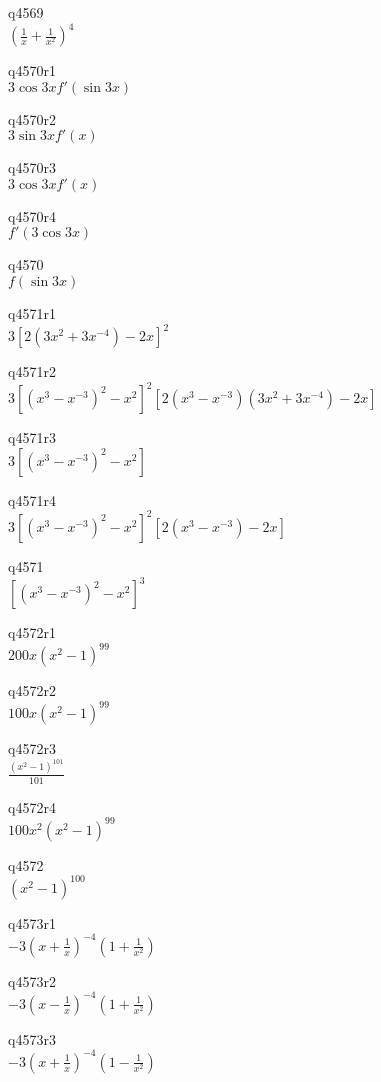 q4569\\
\(\displaystyle \left ( \frac{1}{x} + \frac{1}{x^2} \right ) ^4 \)

q4570r1\\
\(\displaystyle 3 \cos 3x f'(\sin 3x) \)

q4570r2\\
\(\displaystyle 3 \sin 3x f'(x) \)

q4570r3\\
\(\displaystyle 3\cos 3x f'(x) \)

q4570r4\\
\(\displaystyle f'(3 \cos 3x) \)

q4570\\
\(\displaystyle f(\sin 3x) \)

q4571r1\\
\(\displaystyle 3[2(3x^2 + 3x^{-4}) - 2x]^2 \)

q4571r2\\
\(\displaystyle 3[(x^3 - x^{-3})^2 - x^2]^2 [2(x^3 - x^{-3})(3x^2+ 3x^{-4}) - 2x] \)

q4571r3\\
\(\displaystyle 3[(x^3 - x^{-3})^2 - x^2] \)

q4571r4\\
\(\displaystyle 3[(x^3 - x^{-3})^2 - x^2]^2[2(x^3 - x^{-3}) - 2x] \)

q4571\\
\(\displaystyle [(x^3 - x^{-3})^2 - x^2]^3 \)

q4572r1\\
\(\displaystyle 200x(x^2 - 1)^{99} \)

q4572r2\\
\(\displaystyle 100x(x^2 - 1)^{99} \)

q4572r3\\
\(\displaystyle \frac{(x^2 - 1)^{101}}{101} \)

q4572r4\\
\(\displaystyle 100x^2(x^2 - 1)^{99} \)

q4572\\
\(\displaystyle (x^2 - 1)^{100} \)

q4573r1\\
\(\displaystyle -3 \left ( x + \frac{1}{x} \right ) ^{-4} \left ( 1 + \frac{1}{x^2} \right ) \)

q4573r2\\
\(\displaystyle -3 \left ( x - \frac{1}{x} \right )^{-4} \left ( 1 + \frac{1}{x^2} \right ) \)

q4573r3\\
\(\displaystyle -3 \left ( x + \frac{1}{x} \right ) ^{-4} \left (1 - \frac{1}{x^2} \right ) \)

